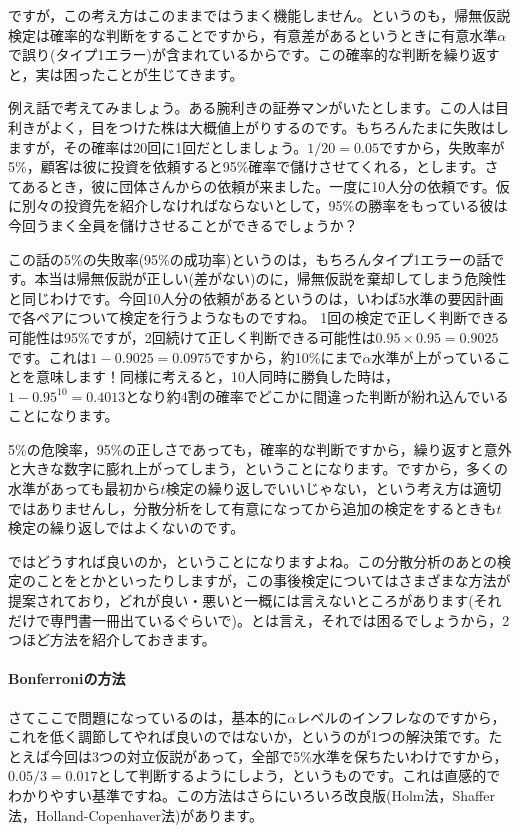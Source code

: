 \documentclass{ltjsarticle}
\begin{document}
ですが，この考え方はこのままではうまく機能しません。というのも，帰無仮説検定は確率的な判断をすることですから，有意差があるというときに有意水準$\alpha$で誤り(タイプ1エラー)が含まれているからです。この確率的な判断を繰り返すと，実は困ったことが生じてきます。

例え話で考えてみましょう。ある腕利きの証券マンがいたとします。この人は目利きがよく，目をつけた株は大概値上がりするのです。もちろんたまに失敗はしますが，その確率は20回に1回だとしましょう。$1/20=0.05$ですから，失敗率が5\%，顧客は彼に投資を依頼すると95\%確率で儲けさせてくれる，とします。さてあるとき，彼に団体さんからの依頼が来ました。一度に10人分の依頼です。仮に別々の投資先を紹介しなければならないとして，95\%の勝率をもっている彼は今回うまく全員を儲けさせることができるでしょうか？

この話の5\%の失敗率(95\%の成功率)というのは，もちろんタイプ1エラーの話です。本当は帰無仮説が正しい(差がない)のに，帰無仮説を棄却してしまう危険性と同じわけです。今回10人分の依頼があるというのは，いわば5水準の要因計画で各ペアについて検定を行うようなものですね。
1回の検定で正しく判断できる可能性は95\%ですが，2回続けて正しく判断できる可能性は$0.95\times0.95=0.9025$です。これは$1-0.9025=0.0975$ですから，約10\%にまで$\alpha$水準が上がっていることを意味します！同様に考えると，10人同時に勝負した時は，$1-0.95^{10}=0.4013$となり約4割の確率でどこかに間違った判断が紛れ込んでいることになります。

5\%の危険率，95\%の正しさであっても，確率的な判断ですから，繰り返すと意外と大きな数字に膨れ上がってしまう，ということになります。ですから，多くの水準があっても最初から$t$検定の繰り返しでいいじゃない，という考え方は適切ではありませんし，分散分析をして有意になってから追加の検定をするときも$t$検定の繰り返しではよくないのです。

ではどうすれば良いのか，ということになりますよね。この分散分析のあとの検定のことをとかといったりしますが，この事後検定についてはさまざまな方法が提案されており，どれが良い・悪いと一概には言えないところがあります(それだけで専門書一冊出ているぐらいで\parencite{BA33892274})。とは言え，それでは困るでしょうから，2つほど方法を紹介しておきます。

\paragraph{Bonferroniの方法}さてここで問題になっているのは，基本的に$\alpha$レベルのインフレなのですから，これを低く調節してやれば良いのではないか，というのが1つの解決策です。たとえば今回は3つの対立仮説があって，全部で5\%水準を保ちたいわけですから，$0.05/3=0.017$として判断するようにしよう，というものです。これは直感的でわかりやすい基準ですね。この方法はさらにいろいろ改良版(Holm法，Shaffer	法，Holland-Copenhaver法)があります。
\end{document}
